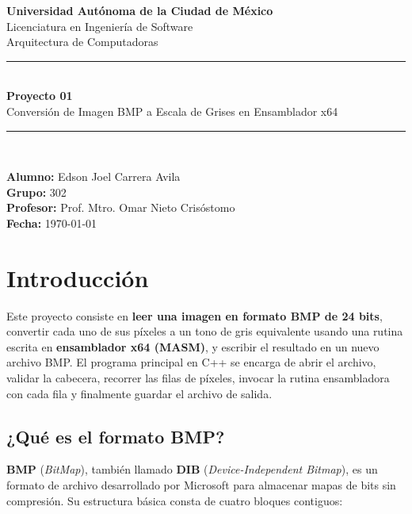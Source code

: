 \documentclass[12pt, letterpaper]{article}
\begin{document}
\begin{titlepage}
    \centering
    \vspace*{1.5cm}

    {\Large \textbf{Universidad Autónoma de la Ciudad de México}}\\[0.3cm]
    {\large Licenciatura en Ingeniería de Software}\\[0.2cm]
    {\large Arquitectura de Computadoras}\\[2.5cm]

    \rule{\linewidth}{0.5pt}\\[0.4cm]
    {\LARGE \bfseries Proyecto 01}\\[0.3cm]
    {\Large Conversión de Imagen BMP a Escala de Grises en Ensamblador x64}\\[0.3cm]
    \rule{\linewidth}{0.5pt}\\[2cm]

    \begin{flushleft}
        \textbf{Alumno:} Edson Joel Carrera Avila \\[0.3cm]
        \textbf{Grupo:} 302 \\[0.3cm]
        \textbf{Profesor:} Prof. Mtro. Omar Nieto Crisóstomo \\[0.3cm]
        \textbf{Fecha:} \today
    \end{flushleft}
    \vfill
\end{titlepage}

\tableofcontents
\newpage

\section{Introducción}

Este proyecto consiste en \textbf{leer una imagen en formato BMP de 24 bits}, convertir cada uno de sus píxeles a un tono de gris equivalente usando una rutina escrita en \textbf{ensamblador x64 (MASM)}, y escribir el resultado en un nuevo archivo BMP. El programa principal en C++ se encarga de abrir el archivo, validar la cabecera, recorrer las filas de píxeles, invocar la rutina ensambladora con cada fila y finalmente guardar el archivo de salida.

\subsection*{¿Qué es el formato BMP?}

\textbf{BMP} (\textit{BitMap}), también llamado \textbf{DIB} (\textit{Device-Independent Bitmap}), es un formato de archivo desarrollado por Microsoft para almacenar mapas de bits sin compresión. Su estructura básica consta de cuatro bloques contiguos:
\end{document}
